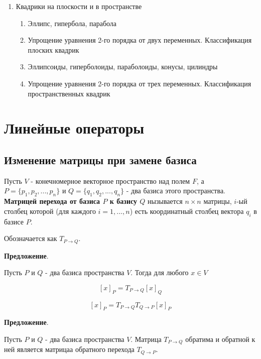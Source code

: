 \documentclass[a4paper]{article}
\begin{document}
\begin{enumerate}
\item Квадрики на плоскости и в пространстве

\begin{enumerate}
\item Эллипс, гипербола, парабола
\item Упрощение уравнения 2-го порядка от двух переменных. Классификация плоских квадрик
\item Эллипсоиды, гиперболоиды, параболоиды, конусы, цилиндры
\item Упрощение уравнения 2-го порядка от трех переменных. Классификация пространственных квадрик
\end{enumerate}

\end{enumerate}


\section*{Линейные операторы}

\subsection*{Изменение матрицы при замене базиса}

Пусть $V$ - конечномерное векторное пространство над полем $F$, а $P = \{ p_1, p_2, ..., p_n \}$ и $Q = \{ q_1, q_2, ..., q_n \}$ - два базиса этого пространства. \textbf{Матрицей перехода от базиса $P$ к базису $Q$} нызывается $n \times n$ матрицы, $i$-ый столбец которой (для каждого $i=1,...,n$) есть координатный столбец вектора $q_i$ в базисе $P$.

Обозначается как $T_{P \rightarrow Q}$.

\begin{htheorem}\textbf{Предложение}.

Пусть $P$ и $Q$ - два базиса пространства $V$.
Тогда для любого $x \in V$

\[
[x]_P = T_{P \rightarrow Q} [x]_Q
\]

\[
[x]_P = T_{P \rightarrow Q} T_{Q \rightarrow P} [x]_P
\]
\end{htheorem}

\begin{htheorem}\textbf{Предложение}.

Пусть $P$ и $Q$ - два базиса пространства $V$. Матрица $T_{P \rightarrow Q}$ обратима и обратной к ней является матрицаа обратного перехода $T_{Q \rightarrow P}$.
\end{htheorem}
\end{document}
